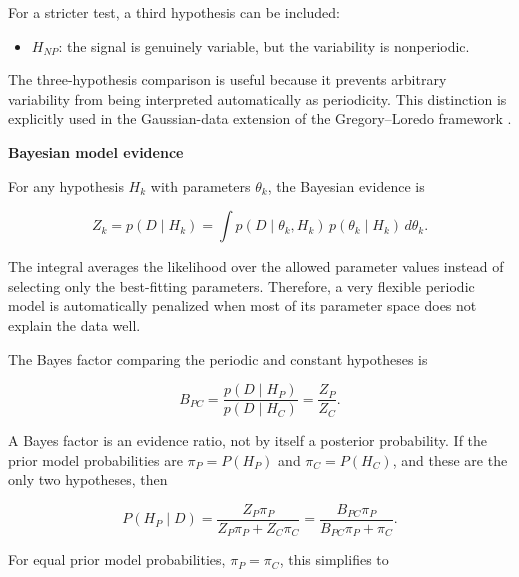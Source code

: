 \documentclass{book}
\providecommand{\ProjectDeepHeading}[2]{%
    \par\medskip\noindent\textbf{#2}\par\smallskip
}
\begin{document}
For a stricter test, a third hypothesis can be included:

\begin{itemize}

    \item $H_{NP}$: the signal is genuinely variable, but the variability is nonperiodic.

\end{itemize}

The three-hypothesis comparison is useful because it prevents arbitrary variability from being interpreted automatically as periodicity. This distinction is explicitly used in the Gaussian-data extension of the Gregory--Loredo framework \citep{gregory-1999-bayesian-periodic-signal-detection-i-analysis-of-20-years-of-radio-flux-measurements-of-the-x-ray-binary-ls-i-plus-61-303}.

\ProjectDeepHeading{4}{Bayesian model evidence}

For any hypothesis $H_k$ with parameters $\ensuremath{\theta}_k$, the Bayesian evidence is

\begin{equation}
Z_k
=
p(D\mid H_k)
=
\int p(D\mid \ensuremath{\theta}_k,H_k)\,p(\ensuremath{\theta}_k\mid H_k)\,d\ensuremath{\theta}_k.
\end{equation}

The integral averages the likelihood over the allowed parameter values instead of selecting only the best-fitting parameters. Therefore, a very flexible periodic model is automatically penalized when most of its parameter space does not explain the data well.

The Bayes factor comparing the periodic and constant hypotheses is

\begin{equation}
B_{PC}
=
\frac{p(D\mid H_P)}{p(D\mid H_C)}
=
\frac{Z_P}{Z_C}.
\end{equation}

A Bayes factor is an evidence ratio, not by itself a posterior probability. If the prior model probabilities are $\ensuremath{\pi}_P=P(H_P)$ and $\ensuremath{\pi}_C=P(H_C)$, and these are the only two hypotheses, then

\begin{equation}
P(H_P\mid D)
=
\frac{Z_P\ensuremath{\pi}_P}{Z_P\ensuremath{\pi}_P+Z_C\ensuremath{\pi}_C}
=
\frac{B_{PC}\ensuremath{\pi}_P}{B_{PC}\ensuremath{\pi}_P+\ensuremath{\pi}_C}.
\end{equation}

For equal prior model probabilities, $\ensuremath{\pi}_P=\ensuremath{\pi}_C$, this simplifies to
\end{document}
